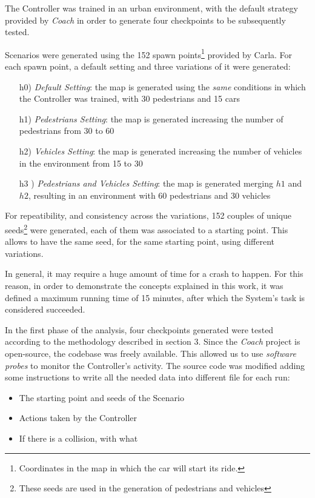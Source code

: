 The Controller was trained in an urban environment, with the default strategy provided by \textsl{Coach} in order to generate four checkpoints to be subsequently tested.

Scenarios were generated using the 152 spawn points\footnote{Coordinates in the map in which the car will start its ride.} provided by Carla.
For each spawn point, a default setting and three variations of it were generated:

\begin{itemize}
	\item[h0)] \textsl{Default Setting}: the map is generated using the \textsl{same} conditions in which the Controller was trained, with 30 pedestrians and 15 cars
	\item[h1)] \textsl{Pedestrians Setting}: the map is generated increasing the number of pedestrians from 30 to 60
	\item[h2)] \textsl{Vehicles Setting}: the map is generated increasing the number of vehicles in the environment from 15 to 30
	\item[h3]) \textsl{Pedestrians and Vehicles Setting}: the map is generated merging $h1$ and $h2$, resulting in an environment with 60 pedestrians and 30 vehicles
\end{itemize}
	
For repeatibility, and consistency across the variations, 152 couples of unique seeds\footnote{These seeds are used in the generation of pedestrians and vehicles} were generated, each of them was associated to a starting point. This allows to have the same seed, for the same starting point, using different variations.

In general, it may require a huge amount of time for a crash to happen. For this reason, in order to demonstrate the concepts explained in this work, it was defined a maximum running time of 15 minutes, after which the System's task is considered succeeded.

In the first phase of the analysis, four checkpoints generated were tested according to the methodology described in section 3.
Since the \textsl{Coach} project is open-source, the codebase was freely available. This allowed us to use \textsl{software probes} to monitor the Controller's activity.
The source code was modified adding some instructions to write all the needed data into different file for each run:

\begin{itemize}
	\item The starting point and seeds of the Scenario
	\item Actions taken by the Controller
	\item If there is a collision, with what
\end{itemize}


